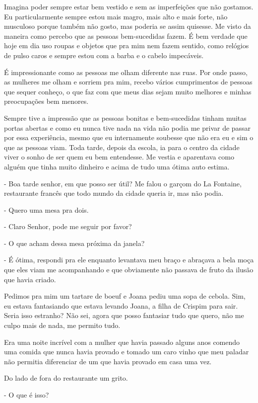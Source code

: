 Imagina poder sempre estar bem vestido e sem as imperfeições que não gostamos. Eu particularmente sempre estou mais magro, mais alto e mais forte, não musculoso porque também não gosto, mas poderia se assim quisesse. Me visto da maneira como percebo que as pessoas bem-sucedidas fazem. É bem verdade que hoje em dia uso roupas e objetos que pra mim nem fazem sentido, como relógios de pulso caros e sempre estou com a barba e o cabelo impecáveis.

É impressionante como as pessoas me olham diferente nas ruas. Por onde passo, as mulheres me olham e sorriem pra mim, recebo vários cumprimentos de pessoas que sequer conheço, o que faz com que meus dias sejam muito melhores e minhas preocupações bem menores. 

Sempre tive a impressão que as pessoas bonitas e bem-sucedidas tinham muitas portas abertas e como eu nunca tive nada na vida não podia me privar de passar por essa experiência, mesmo que eu internamente soubesse que não era eu e sim o que as pessoas viam. Toda tarde, depois da escola, ia para o centro da cidade viver o sonho de ser quem eu bem entendesse. Me vestia e aparentava como alguém que tinha muito dinheiro e acima de tudo uma ótima auto estima.

- Boa tarde senhor, em que posso ser útil? Me falou o garçom do La Fontaine, restaurante francês que todo mundo da cidade queria ir, mas não podia.

- Quero uma mesa pra dois.

- Claro Senhor, pode me seguir por favor?

- O que acham dessa mesa próxima da janela?

- É ótima, respondi pra ele enquanto levantava meu braço e abraçava a bela moça que eles viam me acompanhando e que obviamente não passava de fruto da ilusão que havia criado.

Pedimos pra mim um tartare de boeuf e Joana pediu uma sopa de cebola. Sim, eu estava fantasiando que estava levando Joana, a filha de Crispim para sair. Seria isso estranho? Não sei, agora que posso fantasiar tudo que quero, não me culpo mais de nada, me permito tudo.

Era uma noite incrível com a mulher que havia passado alguns anos comendo uma comida que nunca havia provado e tomado um caro vinho que meu paladar não permitia diferenciar de um que havia provado em casa uma vez.

Do lado de fora do restaurante um grito.

- O que é isso?

